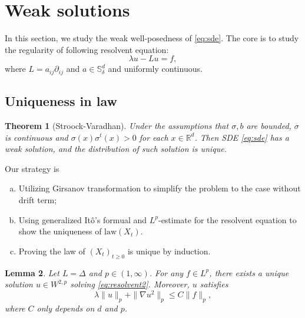 \documentclass[twoside, 12pt]{book}
\numberwithin{equation}{chapter}
\newtheorem{theorem}{Theorem}[section]
\newtheorem{lemma}[theorem]{Lemma}
\def\mR{{\mathbb R}}
\def\mS{{\mathbb S}}
\def\geq{\geqslant}
\def\leq{\leqslant}
\def\p{\partial}
\begin{document}
	\section{Weak solutions}
	
	In this section, we study the weak well-posedness of \eqref{eq:sde}. The core is to study the regularity of following resolvent equation: 
	\begin{equation}\label{eq:resolvent2}
		\lambda u - L u =f,  
	\end{equation}
	where $L=a_{ij}\p_{ij}$ and $a\in \mS_\delta^d$ and uniformly continuous. 
	
	\subsection{Uniqueness in law}
	\begin{theorem}[Stroock-Varadhan]\label{thm:SV}
		 Under the assumptions that $\sigma, b$ are bounded, $\sigma$ is continuous and  $\sigma(x)\sigma^t(x)>0$ for each $x\in \mR^d$. Then SDE  \eqref{eq:sde} has a weak solution, and the distribution of such solution is unique. 
	\end{theorem}
	
	Our strategy is 
	\begin{enumerate}[(a)]
		\item Utilizing Girsanov transformation to simplify the problem to the case without drift term; 
		\item Using generalized It\^o's formual and $L^p$-estimate for the  resolvent equation to show the uniqueness of $\mathrm{law} (X_t)$. 
		\item  Proving the law of $(X_t)_{t\geq 0}$ is unique  by induction. 
	\end{enumerate}
	
    \begin{lemma}\label{lem:laplace-lp}
		Let $L=\Delta$ and $p\in (1,\infty)$. For any $f\in L^p$, there exists a unique solution $u\in W^{2,p}$ solving \eqref{eq:resolvent2}. Moreover, $u$ satisfies  
		\begin{equation}
			\lambda \|u\|_p+\|\nabla u^2\|_{p}\leq C \|f\|_p,  
		\end{equation}
		where $C$ only depends on $d$ and $p$.  
	\end{lemma}
	
\end{document}
